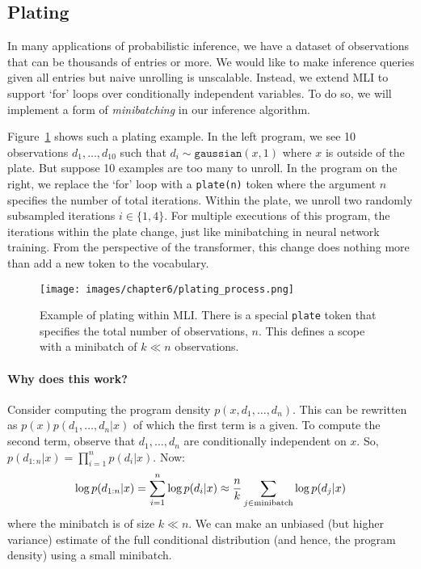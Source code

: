 \subsection{Plating} In many applications of probabilistic inference, we have a dataset of observations that can be thousands of entries or more. We would like to make inference queries given all entries but naive unrolling is unscalable. 
Instead, we extend MLI to support `for' loops over conditionally independent variables. To do so, we will implement a form of \textit{minibatching} in our inference algorithm.

Figure~\ref{fig:plating} shows such a plating example. In the left program, we see 10 observations $d_1, \ldots, d_{10}$ such that $d_i \sim \texttt{gaussian}(x, 1)$ where $x$ is outside of the plate. But suppose 10 examples are too many to unroll. In the program on the right, we replace the `for' loop with a \texttt{plate(n)} token where the argument $n$ specifies the number of total iterations. Within the plate, we unroll two randomly subsampled iterations $i \in \{1, 4\}$. For multiple executions of this program, the iterations within the plate change, just like minibatching in neural network training. From the perspective of the transformer, this change does nothing more than add a new token to the vocabulary.

\begin{figure}[h!]
  \centering
  \texttt{[image: images/chapter6/plating\_process.png]}
  \caption{Example of plating within MLI. There is a special \texttt{plate} token that specifies the total number of  observations, $n$. This defines a scope with a minibatch of $k \ll n$ observations.}
  \label{fig:plating}
\end{figure}

\paragraph{Why does this work?} Consider computing the program density $p(x, d_1, \ldots, d_n)$. This can be rewritten as $p(x)p(d_1, \ldots, d_n|x)$ of which the first term is a given. To compute the second term, observe that $d_1, \ldots, d_n$  are conditionally independent on $x$. So, $p(d_{1:n} | x) = \prod_{i=1}^n p(d_i | x)$. Now:
\begin{equation}
\log p(d_{1:n} | x) = \sum_{i=1}^n \log p(d_i|x) \approx \frac{n}{k} \sum_{j \in \textup{minibatch}} \log p(d_j|x)
\label{eq:minibatch}
\end{equation}
where the minibatch is of size $k \ll n$. We can make an unbiased (but higher variance) estimate of the full conditional distribution (and hence, the program density) using a small minibatch.

